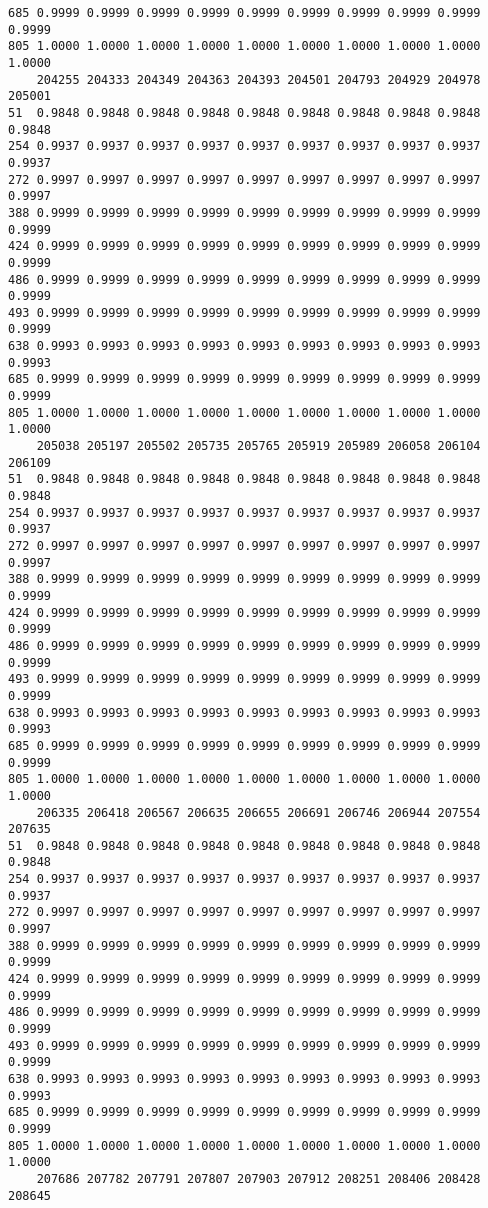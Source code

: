 \documentclass[
]{report}
\begin{document}
\begin{verbatim}
685 0.9999 0.9999 0.9999 0.9999 0.9999 0.9999 0.9999 0.9999 0.9999 0.9999
805 1.0000 1.0000 1.0000 1.0000 1.0000 1.0000 1.0000 1.0000 1.0000 1.0000
    204255 204333 204349 204363 204393 204501 204793 204929 204978 205001
51  0.9848 0.9848 0.9848 0.9848 0.9848 0.9848 0.9848 0.9848 0.9848 0.9848
254 0.9937 0.9937 0.9937 0.9937 0.9937 0.9937 0.9937 0.9937 0.9937 0.9937
272 0.9997 0.9997 0.9997 0.9997 0.9997 0.9997 0.9997 0.9997 0.9997 0.9997
388 0.9999 0.9999 0.9999 0.9999 0.9999 0.9999 0.9999 0.9999 0.9999 0.9999
424 0.9999 0.9999 0.9999 0.9999 0.9999 0.9999 0.9999 0.9999 0.9999 0.9999
486 0.9999 0.9999 0.9999 0.9999 0.9999 0.9999 0.9999 0.9999 0.9999 0.9999
493 0.9999 0.9999 0.9999 0.9999 0.9999 0.9999 0.9999 0.9999 0.9999 0.9999
638 0.9993 0.9993 0.9993 0.9993 0.9993 0.9993 0.9993 0.9993 0.9993 0.9993
685 0.9999 0.9999 0.9999 0.9999 0.9999 0.9999 0.9999 0.9999 0.9999 0.9999
805 1.0000 1.0000 1.0000 1.0000 1.0000 1.0000 1.0000 1.0000 1.0000 1.0000
    205038 205197 205502 205735 205765 205919 205989 206058 206104 206109
51  0.9848 0.9848 0.9848 0.9848 0.9848 0.9848 0.9848 0.9848 0.9848 0.9848
254 0.9937 0.9937 0.9937 0.9937 0.9937 0.9937 0.9937 0.9937 0.9937 0.9937
272 0.9997 0.9997 0.9997 0.9997 0.9997 0.9997 0.9997 0.9997 0.9997 0.9997
388 0.9999 0.9999 0.9999 0.9999 0.9999 0.9999 0.9999 0.9999 0.9999 0.9999
424 0.9999 0.9999 0.9999 0.9999 0.9999 0.9999 0.9999 0.9999 0.9999 0.9999
486 0.9999 0.9999 0.9999 0.9999 0.9999 0.9999 0.9999 0.9999 0.9999 0.9999
493 0.9999 0.9999 0.9999 0.9999 0.9999 0.9999 0.9999 0.9999 0.9999 0.9999
638 0.9993 0.9993 0.9993 0.9993 0.9993 0.9993 0.9993 0.9993 0.9993 0.9993
685 0.9999 0.9999 0.9999 0.9999 0.9999 0.9999 0.9999 0.9999 0.9999 0.9999
805 1.0000 1.0000 1.0000 1.0000 1.0000 1.0000 1.0000 1.0000 1.0000 1.0000
    206335 206418 206567 206635 206655 206691 206746 206944 207554 207635
51  0.9848 0.9848 0.9848 0.9848 0.9848 0.9848 0.9848 0.9848 0.9848 0.9848
254 0.9937 0.9937 0.9937 0.9937 0.9937 0.9937 0.9937 0.9937 0.9937 0.9937
272 0.9997 0.9997 0.9997 0.9997 0.9997 0.9997 0.9997 0.9997 0.9997 0.9997
388 0.9999 0.9999 0.9999 0.9999 0.9999 0.9999 0.9999 0.9999 0.9999 0.9999
424 0.9999 0.9999 0.9999 0.9999 0.9999 0.9999 0.9999 0.9999 0.9999 0.9999
486 0.9999 0.9999 0.9999 0.9999 0.9999 0.9999 0.9999 0.9999 0.9999 0.9999
493 0.9999 0.9999 0.9999 0.9999 0.9999 0.9999 0.9999 0.9999 0.9999 0.9999
638 0.9993 0.9993 0.9993 0.9993 0.9993 0.9993 0.9993 0.9993 0.9993 0.9993
685 0.9999 0.9999 0.9999 0.9999 0.9999 0.9999 0.9999 0.9999 0.9999 0.9999
805 1.0000 1.0000 1.0000 1.0000 1.0000 1.0000 1.0000 1.0000 1.0000 1.0000
    207686 207782 207791 207807 207903 207912 208251 208406 208428 208645

\end{verbatim}
\end{document}

